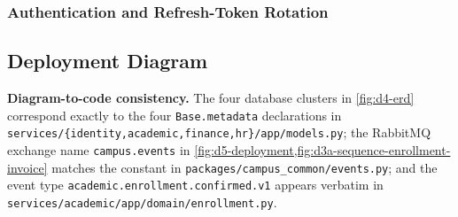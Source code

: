 \subsubsection{Authentication and Refresh-Token Rotation}

\subsection{Deployment Diagram}

\begin{okbox}
\textbf{Diagram-to-code consistency.} The four database clusters in
\cref{fig:d4-erd} correspond exactly to the four \texttt{Base.metadata}
declarations in \texttt{services/\{identity,academic,finance,hr\}/app/models.py};
the RabbitMQ exchange name \texttt{campus.events} in
\cref{fig:d5-deployment,fig:d3a-sequence-enrollment-invoice} matches the
constant in \texttt{packages/campus\_common/events.py}; and the event type
\texttt{academic.enrollment.confirmed.v1} appears verbatim in
\texttt{services/academic/app/domain/enrollment.py}.
\end{okbox}
